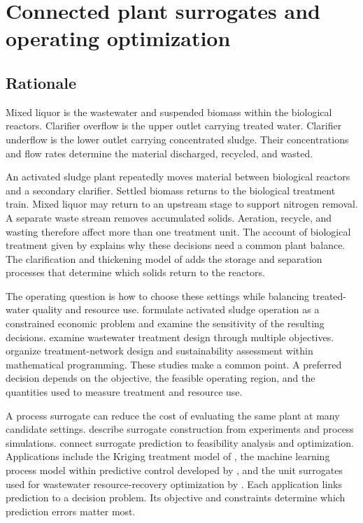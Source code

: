 \chapter{Connected plant surrogates and operating optimization}
\label{ch:plant}

\section{Rationale}

Mixed liquor is the wastewater and suspended biomass within the biological reactors. Clarifier overflow is the upper outlet carrying treated water. Clarifier underflow is the lower outlet carrying concentrated sludge. Their concentrations and flow rates determine the material discharged, recycled, and wasted.

An activated sludge plant repeatedly moves material between biological reactors and a secondary clarifier. Settled biomass returns to the biological treatment train. Mixed liquor may return to an upstream stage to support nitrogen removal. A separate waste stream removes accumulated solids. Aeration, recycle, and wasting therefore affect more than one treatment unit. The account of biological treatment given by \citet{Henze2008} explains why these decisions need a common plant balance. The clarification and thickening model of \citet{HartelPopel1992} adds the storage and separation processes that determine which solids return to the reactors.

The operating question is how to choose these settings while balancing treated-water quality and resource use. \citet{Araujo2013} formulate activated sludge operation as a constrained economic problem and examine the sensitivity of the resulting decisions. \citet{PadronPaez2020} examine wastewater treatment design through multiple objectives. \citet{Aboagye2021} organize treatment-network design and sustainability assessment within mathematical programming. These studies make a common point. A preferred decision depends on the objective, the feasible operating region, and the quantities used to measure treatment and resource use.

A process surrogate can reduce the cost of evaluating the same plant at many candidate settings. \citet{McBride2019} describe surrogate construction from experiments and process simulations. \citet{BhosekarIerapetritou2018} connect surrogate prediction to feasibility analysis and optimization. Applications include the Kriging treatment model of \citet{He2023}, the machine learning process model within predictive control developed by \citet{Bernardelli2020}, and the unit surrogates used for wastewater resource-recovery optimization by \citet{Durkin2024}. Each application links prediction to a decision problem. Its objective and constraints determine which prediction errors matter most.

